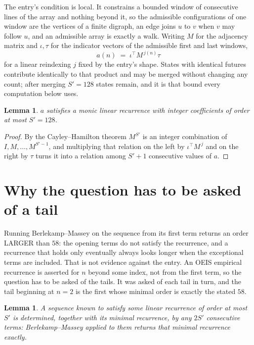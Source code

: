 \documentclass[11pt,a4paper]{article}
\theoremstyle{plain}
\newtheorem{lemma}[theorem]{Lemma}
\theoremstyle{definition}
\begin{document}
The entry's condition is local. It constrains a bounded window of consecutive lines of the
array and nothing beyond it, so the admissible configurations of one window are the vertices of
a finite digraph, an edge joins $u$ to $v$ when $v$ may follow $u$, and an admissible array is
exactly a walk. Writing $M$ for the adjacency matrix and $\iota,\tau$ for the indicator vectors
of the admissible first and last windows,
\[
a(n)\;=\;\iota^{\!\top}M^{\,j(n)}\tau
\]
for a linear reindexing $j$ fixed by the entry's shape. States with identical futures
contribute identically to that product and may be merged without changing any count; after
merging $S'=128$ states remain, and it is that bound every computation below uses.

\begin{lemma}\label{lem:cf}
$a$ satisfies a monic linear recurrence with integer coefficients of order at most $S'=128$.
\end{lemma}

\begin{proof}
By the Cayley--Hamilton theorem $M^{S'}$ is an integer combination of $I,M,\dots,M^{S'-1}$,
and multiplying that relation on the left by $\iota^{\!\top}M^{\,j}$ and on the right by
$\tau$ turns it into a relation among $S'+1$ consecutive values of $a$.
\end{proof}

\section{Why the question has to be asked of a tail}

Running Berlekamp--Massey on the sequence from its first term returns an order LARGER than $58$: the opening terms do not satisfy the recurrence, and a recurrence that holds only eventually always looks longer when the exceptional terms are included. That is not evidence against the entry. An OEIS empirical recurrence is asserted for $n$ beyond some index, not from the first term, so the question has to be asked of the tails. It was asked of each tail in turn, and the tail beginning at $n=2$ is the first whose minimal order is exactly the stated $58$.

\begin{lemma}\label{lem:bm}
A sequence known to satisfy some linear recurrence of order at most $S'$ is determined,
together with its minimal recurrence, by any $2S'$ consecutive terms: Berlekamp--Massey applied
to them returns that minimal recurrence exactly.
\end{lemma}
\end{document}
